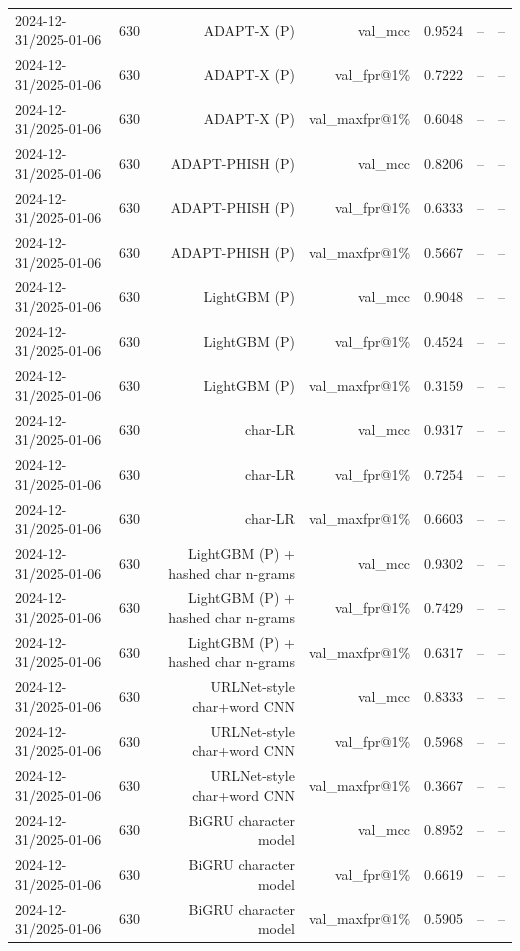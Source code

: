 \begin{table}[t]
\begin{tabular}{llrrrrr}
2024-12-31/2025-01-06 & 630 & ADAPT-X (P) & val\_mcc & 0.9524 & -- & -- \\
2024-12-31/2025-01-06 & 630 & ADAPT-X (P) & val\_fpr@1\% & 0.7222 & -- & -- \\
2024-12-31/2025-01-06 & 630 & ADAPT-X (P) & val\_maxfpr@1\% & 0.6048 & -- & -- \\
2024-12-31/2025-01-06 & 630 & ADAPT-PHISH (P) & val\_mcc & 0.8206 & -- & -- \\
2024-12-31/2025-01-06 & 630 & ADAPT-PHISH (P) & val\_fpr@1\% & 0.6333 & -- & -- \\
2024-12-31/2025-01-06 & 630 & ADAPT-PHISH (P) & val\_maxfpr@1\% & 0.5667 & -- & -- \\
2024-12-31/2025-01-06 & 630 & LightGBM (P) & val\_mcc & 0.9048 & -- & -- \\
2024-12-31/2025-01-06 & 630 & LightGBM (P) & val\_fpr@1\% & 0.4524 & -- & -- \\
2024-12-31/2025-01-06 & 630 & LightGBM (P) & val\_maxfpr@1\% & 0.3159 & -- & -- \\
2024-12-31/2025-01-06 & 630 & char-LR & val\_mcc & 0.9317 & -- & -- \\
2024-12-31/2025-01-06 & 630 & char-LR & val\_fpr@1\% & 0.7254 & -- & -- \\
2024-12-31/2025-01-06 & 630 & char-LR & val\_maxfpr@1\% & 0.6603 & -- & -- \\
2024-12-31/2025-01-06 & 630 & LightGBM (P) + hashed char n-grams & val\_mcc & 0.9302 & -- & -- \\
2024-12-31/2025-01-06 & 630 & LightGBM (P) + hashed char n-grams & val\_fpr@1\% & 0.7429 & -- & -- \\
2024-12-31/2025-01-06 & 630 & LightGBM (P) + hashed char n-grams & val\_maxfpr@1\% & 0.6317 & -- & -- \\
2024-12-31/2025-01-06 & 630 & URLNet-style char+word CNN & val\_mcc & 0.8333 & -- & -- \\
2024-12-31/2025-01-06 & 630 & URLNet-style char+word CNN & val\_fpr@1\% & 0.5968 & -- & -- \\
2024-12-31/2025-01-06 & 630 & URLNet-style char+word CNN & val\_maxfpr@1\% & 0.3667 & -- & -- \\
2024-12-31/2025-01-06 & 630 & BiGRU character model & val\_mcc & 0.8952 & -- & -- \\
2024-12-31/2025-01-06 & 630 & BiGRU character model & val\_fpr@1\% & 0.6619 & -- & -- \\
2024-12-31/2025-01-06 & 630 & BiGRU character model & val\_maxfpr@1\% & 0.5905 & -- & -- \\

\end{tabular}
\end{table}
